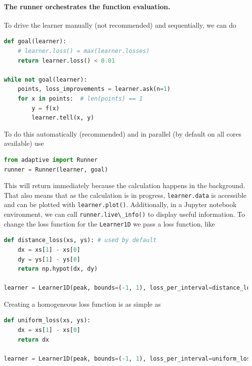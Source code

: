 \documentclass[english, twocolumn, 10pt, aps, superscriptaddress, floatfix, prb, citeautoscript]{revtex4-1}
\newcommand{\passthrough}[1]{\lstset{mathescape=false}#1\lstset{mathescape=true}}
\begin{document}
\hypertarget{the-runner-orchestrates-the-function-evaluation.}{%
\paragraph{The runner orchestrates the function evaluation.}\label{the-runner-orchestrates-the-function-evaluation.}}

To drive the learner manually (not recommended) and sequentially, we can do

\begin{lstlisting}[language=Python]
def goal(learner):
    # learner.loss() = max(learner.losses)
    return learner.loss() < 0.01

while not goal(learner):
    points, loss_improvements = learner.ask(n=1)
    for x in points:  # len(points) == 1
        y = f(x)
        learner.tell(x, y)
\end{lstlisting}

To do this automatically (recommended) and in parallel (by default on all cores available) use

\begin{lstlisting}[language=Python]
from adaptive import Runner
runner = Runner(learner, goal)
\end{lstlisting}

This will return immediately because the calculation happens in the background.
That also means that as the calculation is in progress, \passthrough{\lstinline!learner.data!} is accessible and can be plotted with \passthrough{\lstinline!learner.plot()!}.
Additionally, in a Jupyter notebook environment, we can call \passthrough{\lstinline!runner.live\_info()!} to display useful information.
To change the loss function for the \passthrough{\lstinline!Learner1D!} we pass a loss function, like

\begin{lstlisting}[language=Python]
def distance_loss(xs, ys): # used by default
    dx = xs[1] - xs[0]
    dy = ys[1] - ys[0]
    return np.hypot(dx, dy)

learner = Learner1D(peak, bounds=(-1, 1), loss_per_interval=distance_loss)
\end{lstlisting}

Creating a homogeneous loss function is as simple as

\begin{lstlisting}[language=Python]
def uniform_loss(xs, ys):
    dx = xs[1] - xs[0]
    return dx

learner = Learner1D(peak, bounds=(-1, 1), loss_per_interval=uniform_loss)
\end{lstlisting}
\end{document}
